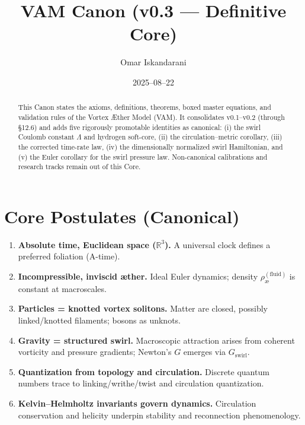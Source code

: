 \documentclass[11pt,a4paper]{article}
\title{VAM Canon (v0.3 — Definitive Core)}
\author{Omar Iskandarani}
\date{2025--08--22}
\newcommand{\aeFluid}{\rho_{\text{\ae}}^{(\text{fluid})}}
\begin{document}
    \maketitle

    \begin{abstract}
        This Canon states the axioms, definitions, theorems, boxed master equations, and validation rules of the Vortex \AE{}ther Model (VAM). It consolidates v0.1--v0.2 (through \S12.6) and adds five rigorously promotable identities as canonical: (i) the swirl Coulomb constant $\Lambda$ and hydrogen soft-core, (ii) the circulation--metric corollary, (iii) the corrected time-rate law, (iv) the dimensionally normalized swirl Hamiltonian, and (v) the Euler corollary for the swirl pressure law. Non-canonical calibrations and research tracks remain out of this Core.
    \end{abstract}

    \tableofcontents

    \section{Core Postulates (Canonical)}
    \label{sec:postulates}
    \begin{enumerate}
        \item \textbf{Absolute time, Euclidean space ($\mathbb{R}^3$).} A universal clock defines a preferred foliation (A-time).
        \item \textbf{Incompressible, inviscid æther.} Ideal Euler dynamics; density $\aeFluid$ is constant at macroscales.
        \item \textbf{Particles = knotted vortex solitons.} Matter are closed, possibly linked/knotted filaments; bosons as unknots.
        \item \textbf{Gravity = structured swirl.} Macroscopic attraction arises from coherent vorticity and pressure gradients; Newton’s $G$ emerges via $G_{\text{swirl}}$.
        \item \textbf{Quantization from topology and circulation.} Discrete quantum numbers trace to linking/writhe/twist and circulation quantization.
        \item \textbf{Kelvin–Helmholtz invariants govern dynamics.} Circulation conservation and helicity underpin stability and reconnection phenomenology.
    \end{enumerate}

\end{document}

